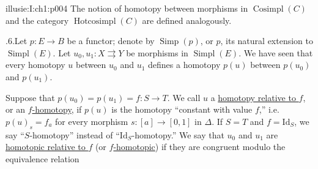 \begin{illusiebodypage}{illusie:I:ch1:p004}
\hypertarget{illusie:I:ch1:s1:1:p12}{}%
The notion of homotopy between morphisms in $\operatorname{Cosimpl}(C)$ and
the category $\operatorname{Hotcosimpl}(C)$ are defined analogously.

\hypertarget{illusie:I:ch1:s1:1:p13}{}%
.6.\quad Let $p:E\longrightarrow B$ be a functor; denote by
$\operatorname{Simp}(p)$, or $p$, its natural extension to
$\operatorname{Simpl}(E)$. Let $u_0,u_1:X\rightrightarrows Y$ be morphisms in
$\operatorname{Simpl}(E)$. We have seen that every homotopy $u$ between $u_0$
and $u_1$ defines a homotopy $p(u)$ between $p(u_0)$ and $p(u_1)$.

\hypertarget{illusie:I:ch1:s1:1:p14}{}%
Suppose that $p(u_0)=p(u_1)=f:S\longrightarrow T$. We call $u$ a
\underline{homotopy relative to $f$}, or an \underline{$f$-homotopy}, if
$p(u)$ is the homotopy “constant with value $f$,” i.e. $p(u)_s=f_a$ for every
morphism $s:[a]\longrightarrow[0,1]$ in $\Delta$. If $S=T$ and
$f=\mathrm{Id}_S$, we say “$S$-homotopy” instead of
“$\mathrm{Id}_S$-homotopy.” We say that $u_0$ and $u_1$ are
\underline{homotopic relative to $f$} (or \underline{$f$-homotopic}) if they
are congruent modulo the equivalence relation
\end{illusiebodypage}
